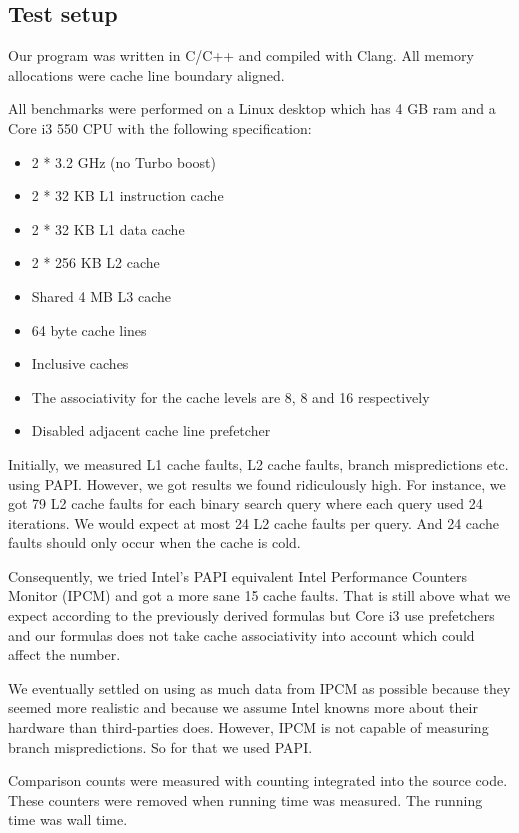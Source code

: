 \subsection{Test setup}

Our program was written in C/C++ and compiled with Clang. All memory allocations were cache line boundary aligned.

All benchmarks were performed on a Linux desktop which has 4 GB ram and a Core i3 550 CPU with the following specification:

\begin{itemize}
\item 2 * 3.2 GHz (no Turbo boost)
\item 2 * 32 KB L1 instruction cache
\item 2 * 32 KB L1 data cache
\item 2 * 256 KB L2 cache
\item Shared 4 MB L3 cache
\item 64 byte cache lines
\item Inclusive caches
\item The associativity for the cache levels are 8, 8 and 16 respectively
\item Disabled adjacent cache line prefetcher
\end{itemize}

Initially, we measured L1 cache faults, L2 cache faults, branch mispredictions etc. using PAPI. However, we got results we found ridiculously high.
For instance, we got 79 L2 cache faults for each binary search query where each query used 24 iterations.
We would expect at most 24 L2 cache faults per query. And 24 cache faults should only occur when the cache is cold.

Consequently, we tried Intel's PAPI equivalent Intel Performance Counters Monitor (IPCM) and got a more sane 15 cache faults.
That is still above what we expect according to the previously derived formulas but Core i3 use prefetchers and our formulas does not take cache associativity into account which could affect the number.

We eventually settled on using as much data from IPCM as possible because they seemed more realistic and because we
assume Intel knowns more about their hardware than third-parties does. However, IPCM is not capable of measuring branch mispredictions. So for that we used PAPI.

Comparison counts were measured with counting integrated into the source code. These counters were removed when running time was measured. The running time was wall time.

